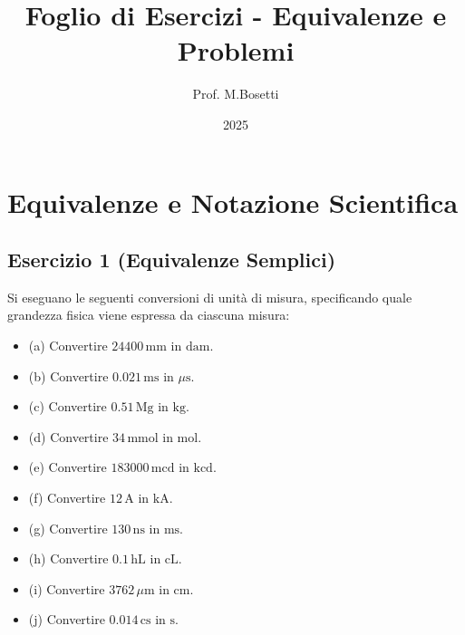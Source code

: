 \documentclass[a4paper,12pt]{article}
\title{Foglio di Esercizi - Equivalenze e Problemi}
\author{Prof. M.Bosetti}
\date{2025}
\begin{document}
\maketitle

\section*{Equivalenze e Notazione Scientifica}

\subsection*{Esercizio 1 (Equivalenze Semplici)}
Si eseguano le seguenti conversioni di unità di misura, specificando quale grandezza fisica viene espressa da ciascuna misura:
\begin{itemize}
    \item (a) Convertire \(24400 \, \text{mm}\) in \(\text{dam}\).
    \item (b) Convertire \(0.021 \, \text{ms}\) in \(\mu\text{s}\).
    \item (c) Convertire \(0.51 \, \text{Mg}\) in \(\text{kg}\).
    \item (d) Convertire \(34 \, \text{mmol}\) in \(\text{mol}\).
    \item (e) Convertire \(183000 \, \text{mcd}\) in \(\text{kcd}\).
    \item (f) Convertire \(12 \, \text{A}\) in \(\text{kA}\).
    \item (g) Convertire \(130 \, \text{ns}\) in \(\text{ms}\).
    \item (h) Convertire \(0.1 \, \text{hL}\) in \(\text{cL}\).
    \item (i) Convertire \(3762 \, \mu\text{m}\) in \(\text{cm}\).
    \item (j) Convertire \(0.014 \, \text{cs}\) in \(\text{s}\).
\end{itemize}
\end{document}
